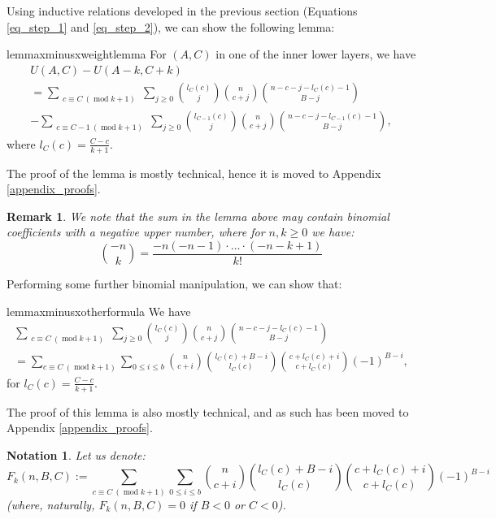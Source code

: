 \documentclass[11pt, reqno]{amsart}
\newtheorem*{remark}{Remark}
\newtheorem*{notation}{Notation}
\numberwithin{equation}{section}
\newcommand\modd{\operatorname{mod}}
\begin{document}
Using inductive relations developed in the previous section (Equations \ref{eq_step_1} and \ref{eq_step_2}), we can show the following lemma:

\begin{restatable}{lemma}{xminusxweightlemma}
\label{x_minus_x_weight_lemma}
    For $(A, C)$ in one of the inner lower layers, we have
    \begin{multline*}
        U(A, C) - U(A-k, C+k)\\
        =\sum_{\substack{c \equiv C \ (\modd k+1)}} \sum_{j \geqslant 0} \binom{l_C(c)}{j} \binom{n}{c+j} \binom{n-c-j-l_C(c)-1}{B-j}\\ - \sum_{\substack{c \equiv C-1 \ (\modd k+1)}} \sum_{j \geqslant 0} \binom{l_{C-1}(c)}{j} \binom{n}{c+j} \binom{n-c-j-l_{C-1}(c)-1}{B-j},
    \end{multline*}
    where $l_C(c)=\frac{C-c}{k+1}$.
\end{restatable}
The proof of the lemma is mostly technical, hence it is moved to Appendix \ref{appendix_proofs}.

\begin{remark}
    We note that the sum in the lemma above may contain binomial coefficients with a negative upper number, where for $n, k \geqslant 0$ we have:
    \begin{equation}
        \binom{-n}{k} = \frac{-n(-n-1)\cdot \dots \cdot (-n-k+1)}{k!}
    \end{equation}
\end{remark}

Performing some further binomial manipulation, we can show that:

\begin{restatable}{lemma}{xminusxotherformula}
\label{x_minus_x_other_formula}
    We have
    \begin{multline*}
        \sum_{\substack{c \equiv C \ (\modd k+1)}} \sum_{j \geqslant 0} \binom{l_C(c)}{j} \binom{n}{c+j} \binom{n-c-j-l_C(c)-1}{B-j}\\ = \sum_{c \equiv C \ (\modd k+1)} \sum_{0 \leqslant i \leqslant b} \binom{n}{c+i}\binom{l_C(c)+B-i}{l_C(c)}\binom{c+l_C(c)+i}{c+l_C(c)} (-1)^{B-i},
    \end{multline*}
    for $l_C(c)=\frac{C-c}{k+1}$.
\end{restatable}

The proof of this lemma is also mostly technical, and as such has been moved to Appendix \ref{appendix_proofs}.

\begin{notation}
    Let us denote:
    \begin{equation}
    \label{fknbc_def}
        F_k(n, B, C) := \sum_{c \equiv C \ (\modd k+1)} \sum_{0 \leqslant i \leqslant b} \binom{n}{c+i}\binom{l_C(c)+B-i}{l_C(c)}\binom{c+l_C(c)+i}{c+l_C(c)} (-1)^{B-i}
    \end{equation}
    (where, naturally, $F_k(n, B, C)=0$ if $B < 0$ or $C < 0$).
\end{notation}
\end{document}
